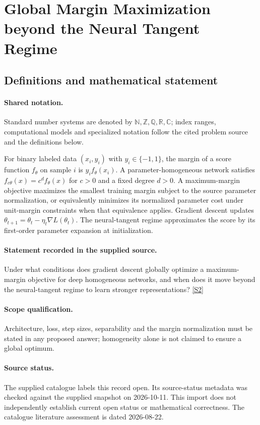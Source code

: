 \documentclass[11pt]{article}
\newcommand{\sref}[2]{\hyperlink{source:#1:#2}{[S#2]}}
\begin{document}
\section{Global Margin Maximization beyond the Neural Tangent Regime}\label{statement}

\subsection{Definitions and mathematical statement}

\paragraph{Shared notation.}Standard number systems are denoted by $\mathbb N,\mathbb Z,\mathbb Q,\mathbb R,\mathbb C$; index ranges, computational models and specialized notation follow the cited problem source and the definitions below.


For binary labeled data $(x_i,y_i)$ with $y_i\in\{-1,1\}$, the margin of a score function $f_\theta$ on sample $i$ is $y_i f_\theta(x_i)$. A parameter-homogeneous network satisfies $f_{c\theta}(x)=c^d f_\theta(x)$ for $c>0$ and a fixed degree $d>0$. A maximum-margin objective maximizes the smallest training margin subject to the source parameter normalization, or equivalently minimizes its normalized parameter cost under unit-margin constraints when that equivalence applies. Gradient descent updates $\theta_{t+1}=\theta_t-\eta_t\nabla L(\theta_t)$. The neural-tangent regime approximates the score by its first-order parameter expansion at initialization.
\paragraph{Statement recorded in the supplied source.}
Under what conditions does gradient descent globally optimize a maximum-margin objective for deep homogeneous networks, and when does it move beyond the neural-tangent regime to learn stronger representations? \sref{statement}{2}
\paragraph{Scope qualification.}
Architecture, loss, step sizes, separability and the margin normalization must be stated in any proposed answer; homogeneity alone is not claimed to ensure a global optimum.
\paragraph{Source status.}
The supplied catalogue labels this record open. Its source-status metadata was checked against the supplied snapshot on 2026-10-11. This import does not independently establish current open status or mathematical correctness. The catalogue literature assessment is dated 2026-08-22.
\end{document}
